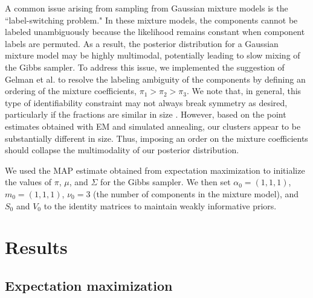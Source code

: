 \documentclass[twoside]{article}
\theoremstyle{theorem}
\theoremstyle{theorem}
\theoremstyle{theorem}
\theoremstyle{lemma}
\theoremstyle{definition}
\theoremstyle{example}
\begin{document}
A common issue arising from sampling from Gaussian mixture models is the ``label-switching problem." In these mixture models, the components cannot be labeled unambiguously because the likelihood remains constant when component labels are permuted.  As a result, the posterior distribution for a Gaussian mixture model may be highly multimodal, potentially leading to slow mixing of the Gibbs sampler. To address this issue, we implemented the suggestion of Gelman et al. \cite{Gelman} to resolve the labeling ambiguity of the components by defining an ordering of the mixture coefficients, $\pi_1 > \pi_2 > \pi_3$. We note that, in general, this type of identifiability constraint may not always break symmetry as desired, particularly if the fractions are similar in size \cite{Stephens}. However, based on the point estimates obtained with EM and simulated annealing, our clusters appear to be substantially different in size. Thus, imposing an order on the mixture coefficients should collapse the multimodality of our posterior distribution.

We used the MAP estimate obtained from expectation maximization to initialize the values of $\pi$, $\mu$, and $\Sigma$ for the Gibbs sampler. We then set $\alpha_0 = (1,1,1)$, $m_0 = (1,1,1)$, $\nu_0 = 3$ (the number of components in the mixture model), and $S_0$ and $V_0$ to the identity matrices to maintain weakly informative priors.   

\section{Results}

\subsection{Expectation maximization}
\end{document}
